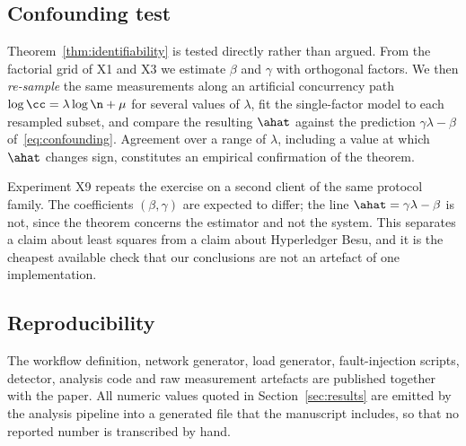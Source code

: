 \subsection{Confounding test}

Theorem~\ref{thm:identifiability} is tested directly rather than argued. From
the factorial grid of X1 and X3 we estimate $\beta$ and $\gamma$ with
orthogonal factors. We then \emph{re-sample} the same measurements along an
artificial concurrency path $\log\cc=\lambda\log\n+\mu$ for several values of
$\lambda$, fit the single-factor model to each resampled subset, and compare the
resulting $\ahat$ against the prediction $\gamma\lambda-\beta$
of~\eqref{eq:confounding}. Agreement over a range of $\lambda$, including a
value at which $\ahat$ changes sign, constitutes an empirical confirmation of
the theorem.

Experiment X9 repeats the exercise on a second client of the same protocol
family. The coefficients $(\beta,\gamma)$ are expected to differ; the line
$\ahat=\gamma\lambda-\beta$ is not, since the theorem concerns the estimator and
not the system. This separates a claim about least squares from a claim about
Hyperledger Besu, and it is the cheapest available check that our conclusions
are not an artefact of one implementation.

\subsection{Reproducibility}

The workflow definition, network generator, load generator, fault-injection
scripts, detector, analysis code and raw measurement artefacts are published
together with the paper. All numeric values quoted in
Section~\ref{sec:results} are emitted by the analysis pipeline into a generated
file that the manuscript includes, so that no reported number is transcribed by
hand.
